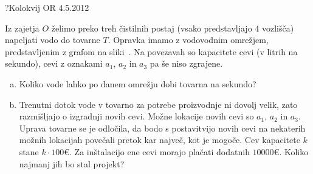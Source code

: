\begin{naloga}{?}{Kolokvij OR 4.5.2012}
\begin{vprasanje}[zajetje]
Iz zajetja $O$ želimo preko treh čistilnih postaj
(vsako predstavljajo $4$ vozlišča)
napeljati vodo do tovarne $T$.
Opravka imamo z vodovodnim omrežjem,
pred\-stav\-lje\-nim z grafom na sliki~\fig{}.
Na povezavah so kapacitete cevi (v litrih na sekundo),
cevi z oznakami $a_1$, $a_2$ in $a_3$ pa še niso zgrajene.

\begin{enumerate}[(a)]
\item Koliko vode lahko po danem omrežju dobi tovarna na sekundo?

\item Trenutni dotok vode v tovarno za potrebe proizvodnje ni dovolj velik,
zato razmišljajo o izgradnji novih cevi.
Možne lokacije novih cevi so $a_1$, $a_2$ in $a_3$.
Uprava tovarne se je odločila,
da bodo s postavitvijo novih cevi na nekaterih možnih lokacijah
povečali pretok kar največ, kot je mogoče.
Cev kapacitete $k$ stane $k \cdot 100 €$.
Za inštalacijo ene cevi morajo plačati dodatnih $10000 €$.
Koliko najmanj jih bo stal projekt?
\end{enumerate}

\begin{slika}
\makebox[\textwidth][c]{
\pgfslika
}
\end{slika}
\end{vprasanje}
\begin{odgovor}
\end{odgovor}
\end{naloga}


